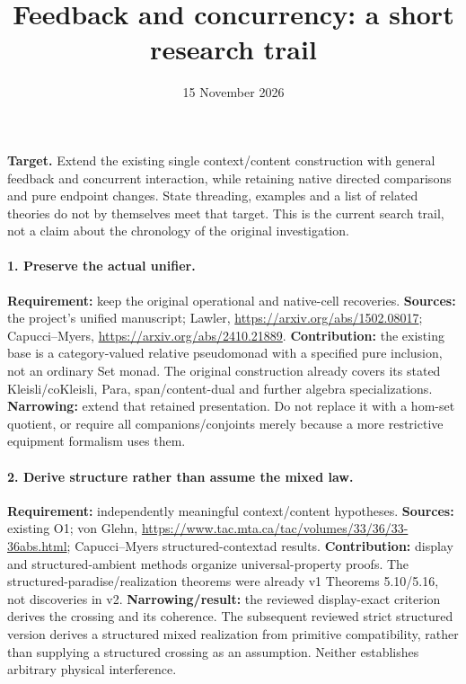 \documentclass[11pt]{article}
\title{Feedback and concurrency: a short research trail}
\date{15 November 2026}
\begin{document}
\maketitle
\noindent\textbf{Target.} Extend the existing single context/content construction with general feedback and concurrent interaction, while retaining native directed comparisons and pure endpoint changes. State threading, examples and a list of related theories do not by themselves meet that target. This is the current search trail, not a claim about the chronology of the original investigation.

\paragraph{1. Preserve the actual unifier.}
\textbf{Requirement:} keep the original operational and native-cell recoveries.\newline
\textbf{Sources:} the project's unified manuscript; Lawler, \url{https://arxiv.org/abs/1502.08017}; Capucci--Myers, \url{https://arxiv.org/abs/2410.21889}.\newline
\textbf{Contribution:} the existing base is a category-valued relative pseudomonad with a specified pure inclusion, not an ordinary Set monad. The original construction already covers its stated Kleisli/coKleisli, Para, span/content-dual and further algebra specializations.\newline
\textbf{Narrowing:} extend that retained presentation. Do not replace it with a hom-set quotient, or require all companions/conjoints merely because a more restrictive equipment formalism uses them.

\paragraph{2. Derive structure rather than assume the mixed law.}
\textbf{Requirement:} independently meaningful context/content hypotheses.\newline
\textbf{Sources:} existing O1; von Glehn, \url{https://www.tac.mta.ca/tac/volumes/33/36/33-36abs.html}; Capucci--Myers structured-contextad results.\newline
\textbf{Contribution:} display and structured-ambient methods organize universal-property proofs. The structured-paradise/realization theorems were already v1 Theorems 5.10/5.16, not discoveries in v2.\newline
\textbf{Narrowing/result:} the reviewed display-exact criterion derives the crossing and its coherence. The subsequent reviewed strict structured version derives a structured mixed realization from primitive compatibility, rather than supplying a structured crossing as an assumption. Neither establishes arbitrary physical interference.
\end{document}
